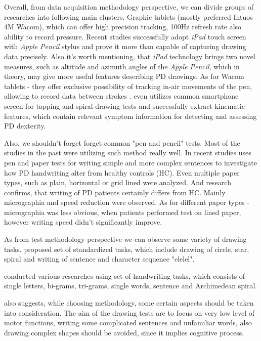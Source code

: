 Overall, from data acquisition methodology perspective, we can divide groups of researches into following main clusters. Graphic tablets (mostly preferred Intuos 4M Wacom), which can offer high precision tracking, 100Hz refresh rate also ability to record pressure. Recent studies \cite{sisti2017computerized, masarov2017clock} successfully adopt \textit{iPad} touch screen with \textit{Apple Pencil} stylus and prove it more than capable of capturing drawing data precisely. Also it's worth mentioning, that \textit{iPad} technology brings two novel measures, such as altitude and azimuth angles \cite{masarov2017clock} of the \textit{Apple Pencil}, which in theory, may give more useful features describing PD drawings. As for Wacom tablets - they offer exclusive possibility of tracking in-air movements of the pen, allowing to record data between strokes \cite{drotar2013new}.  \citet{aghanavesi2017smartphone} even utilizes common smartphone screen for tapping and spiral drawing tests and successfully extract kinematic features, which contain relevant symptom information for detecting and assessing PD dexterity.

Also, we shouldn't forget forget common "pen and pencil" tests. Most of the studies in the past were utilizing such method really well. In recent studies \citet{raudmann2014handwriting} uses pen and paper tests for writing simple and more complex sentences to investigate how PD handwriting alter from healthy controls (HC). Even multiple paper types, such as plain, horizontal or grid lined were analyzed. And research confirms, that writing of PD patients certainly differs from HC. Mainly micrographia and speed reduction were observed. As for different paper types - micrographia was less obvious, when patients performed test on lined paper, however writing speed didn't significantly improve.


% 
% 

As from test methodology perspective we can observe some variety of drawing tasks. \citet*{smits2014standardized} proposed set of standardized tasks, which include drawing of circle, star, spiral and writing of sentence and character sequence "elelel".

\citet*{drotar2015decision} conducted various researches \cite{drotar2013new, drotar2016evaluation, drotar2015contribution} using set of handwriting tasks, which consists of single letters, bi-grams, tri-grams, single words, sentence and Archimedean spiral.

\citet{letanneux2014micrographia} also suggests, while choosing methodology, some certain aspects should be taken into consideration. The aim of the drawing tests are to focus on very low level of motor functions, writing some complicated sentences and unfamiliar words, also drawing complex shapes should be avoided, since it implies cognitive process. 

